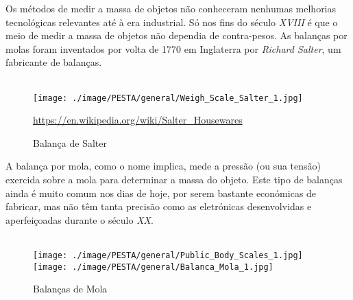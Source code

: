 Os métodos de medir a massa de objetos não conheceram nenhumas melhorias tecnológicas relevantes até à era industrial. Só nos fins do século \textit{XVIII} é que o meio de medir a massa de objetos não dependia de contra-pesos. As balanças por molas foram inventados por volta de 1770 em Inglaterra por \textit{Richard Salter}, um fabricante de balanças.
\\
\\
\begin{figure}[H]
	\centering
	\texttt{[image: ./image/PESTA/general/Weigh\_Scale\_Salter\_1.jpg]}
	\caption{Balança de Salter}
	\url{https://en.wikipedia.org/wiki/Salter_Housewares}
	\label{Weigh_Scale_Salter_1}
\end{figure}
A balança por mola, como o nome implica, mede a pressão (ou sua tensão) exercida sobre a mola para determinar a massa do objeto. Este tipo de balanças ainda é muito comum nos dias de hoje, por serem bastante económicas de fabricar, mas não têm tanta precisão como as eletrónicas desenvolvidas e aperfeiçoadas durante o século \textit{XX}.
\\
\\
\begin{minipage}[!b]{\linewidth}
	\begin{figure}[H]
		\captionsetup{justification=raggedright,singlelinecheck=false}
		\flushleft
		\hspace{.4cm}
		\texttt{[image: ./image/PESTA/general/Public\_Body\_Scales\_1.jpg]}
		\hspace{.4cm}
		\texttt{[image: ./image/PESTA/general/Balanca\_Mola\_1.jpg]}
		\caption{Balanças de Mola}
		\label{Balanca_Mola_1}
	\end{figure}
\end{minipage}
